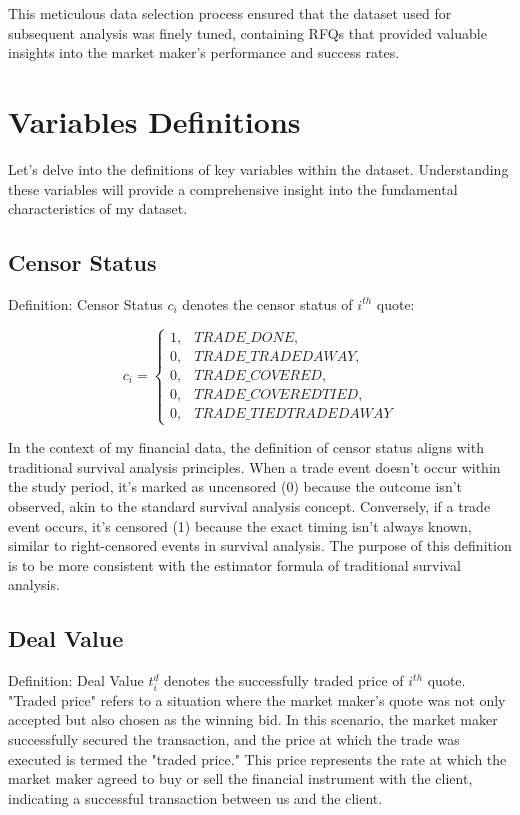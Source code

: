 This meticulous data selection process ensured that the dataset used for subsequent analysis was finely tuned, containing RFQs that provided valuable insights into the market maker's performance and success rates.

\section{Variables Definitions}
Let's delve into the definitions of key variables within the dataset. Understanding these variables will provide a comprehensive insight into the fundamental characteristics of my dataset.

\subsection{Censor Status}
Definition: Censor Status $c_i$ denotes the censor status of $i^{th}$ quote:

\[
c_i =
\begin{cases}
    1, & \textit{TRADE\_DONE}, \\
    0, & \textit{TRADE\_TRADEDAWAY,} \\
    0, & \textit{TRADE\_COVERED,} \\
    0, & \textit{TRADE\_COVEREDTIED,} \\
    0, & \textit{TRADE\_TIEDTRADEDAWAY}
\end{cases}
\]

In the context of my financial data, the definition of censor status aligns with traditional survival analysis principles. When a trade event doesn't occur within the study period, it's marked as uncensored (0) because the outcome isn't observed, akin to the standard survival analysis concept. Conversely, if a trade event occurs, it's censored (1) because the exact timing isn't always known, similar to right-censored events in survival analysis. The purpose of this definition is to be more consistent with the estimator formula of traditional survival analysis.

\subsection{Deal Value}
Definition: Deal Value $t^d_i$ denotes the successfully traded price of $i^{th}$ quote. "Traded price" refers to a situation where the market maker's quote was not only accepted but also chosen as the winning bid. In this scenario, the market maker successfully secured the transaction, and the price at which the trade was executed is termed the "traded price." This price represents the rate at which the market maker agreed to buy or sell the financial instrument with the client, indicating a successful transaction between us and the client.

